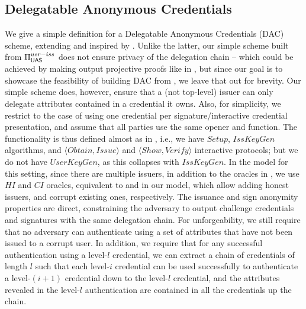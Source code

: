 \subsection{Delegatable Anonymous Credentials}
\label{ssec:related-models-dac}

We give a simple definition for a Delegatable Anonymous Credentials (DAC)
scheme, extending \cite{fhs19} and inspired by \cite{bcc+09}. Unlike the latter,
our simple scheme built from $\Pi_{\mathsf{UAS}}^{usr-iss}$ does not ensure privacy of the
delegation chain -- which could be achieved by making \feval output projective
proofs like in \cite{bcc+09}, but since our goal is to showcase the feasibility
of building DAC from \UAS, we leave that out for brevity. Our simple scheme
does, however, ensure that a (not top-level) issuer can only delegate attributes
contained in a credential it owns. Also, for simplicity, we restrict to the case
of using one credential per signature/interactive credential presentation, and
assume that all parties use the same opener and \finsp function.
%
The functionality is thus defined almost as in ,
i.e., we have $Setup$, $IssKeyGen$ algorithms, and $\langle Obtain,Issue\rangle$
and $\langle Show,Verify \rangle$ interactive protocols; but we do not have
$UserKeyGen$, as this collapses with $IssKeyGen$.
%
In the model for this setting, since there are multiple issuers, in addition
to the oracles in , we use $HI$ and $CI$ oracles,
equivalent to \IGEN and \ICORR in our \UAS model, which allow adding honest
issuers, and corrupt existing ones, respectively. The issuance and sign
anonymity properties are direct, constraining the adversary to output challenge
credentials and signatures with the same delegation chain. For unforgeability,
we still require that no adversary can authenticate using a set of attributes
that have not been issued to a corrupt user. In addition, we require that for
any successful authentication using a level-$l$ credential, we
can extract a chain of credentials of length $l$ such that each level-$i$
credential can be used successfully to authenticate a level-$(i+1)$ credential
down to the level-$l$ credential, and the attributes revealed in the
level-$l$ authentication are contained in all the credentials up the chain.

